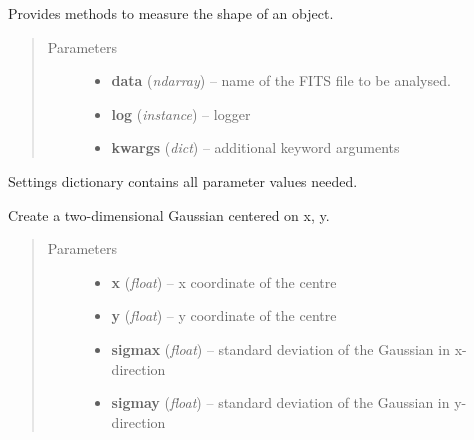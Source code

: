 \documentclass[a4paper,12pt,english]{sphinxmanual}
\begin{document}
\begin{fulllineitems}
\label{analysis:analysis.shape.shapeMeasurement}
Provides methods to measure the shape of an object.
\begin{quote}\begin{description}
\item[{Parameters}] \leavevmode\begin{itemize}
\item {} 
\textbf{data} (\emph{ndarray}) -- name of the FITS file to be analysed.

\item {} 
\textbf{log} (\emph{instance}) -- logger

\item {} 
\textbf{kwargs} (\emph{dict}) -- additional keyword arguments

\end{itemize}

\end{description}\end{quote}

Settings dictionary contains all parameter values needed.

\begin{fulllineitems}
\label{analysis:analysis.shape.shapeMeasurement.Gaussian2D}
Create a two-dimensional Gaussian centered on x, y.
\begin{quote}\begin{description}
\item[{Parameters}] \leavevmode\begin{itemize}
\item {} 
\textbf{x} (\emph{float}) -- x coordinate of the centre

\item {} 
\textbf{y} (\emph{float}) -- y coordinate of the centre

\item {} 
\textbf{sigmax} (\emph{float}) -- standard deviation of the Gaussian in x-direction

\item {} 
\textbf{sigmay} (\emph{float}) -- standard deviation of the Gaussian in y-direction

\end{itemize}


\end{description}
\end{quote}
\end{fulllineitems}
\end{fulllineitems}
\end{document}
